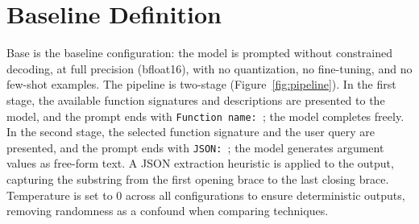 \section{Baseline Definition}
\label{sec:baseline-def}

Base is the baseline configuration: the model is prompted
without constrained decoding, at full precision (bfloat16),
with no quantization, no fine-tuning, and no few-shot
examples. The pipeline is two-stage (Figure~\ref{fig:pipeline}). In the first stage,
the available function signatures and descriptions are
presented to the model, and the prompt ends with
\texttt{Function name:~}; the model completes freely.
In the second stage, the selected function signature and
the user query are presented, and the prompt ends with
\texttt{JSON:~}; the model generates argument values as
free-form text. A JSON extraction heuristic is applied to
the output, capturing the substring from the first
opening brace to the last closing brace. Temperature is set
to 0 across all configurations to ensure deterministic
outputs, removing randomness as a confound when comparing
techniques.

